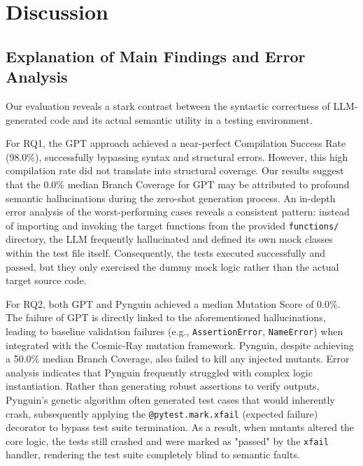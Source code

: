 \section{Discussion}
\label{sec:discussion}

\subsection{Explanation of Main Findings and Error Analysis}
\label{subsec:explanation}

Our evaluation reveals a stark contrast between the syntactic correctness of LLM-generated code and its actual semantic utility in a testing environment. 

For RQ1, the GPT approach achieved a near-perfect Compilation Success Rate (98.0\%), successfully bypassing syntax and structural errors. However, this high compilation rate did not translate into structural coverage. Our results suggest that the 0.0\% median Branch Coverage for GPT may be attributed to profound semantic hallucinations during the zero-shot generation process. An in-depth error analysis of the worst-performing cases reveals a consistent pattern: instead of importing and invoking the target functions from the provided \texttt{functions/} directory, the LLM frequently hallucinated and defined its own mock classes within the test file itself. Consequently, the tests executed successfully and passed, but they only exercised the dummy mock logic rather than the actual target source code.

For RQ2, both GPT and Pynguin achieved a median Mutation Score of 0.0\%. The failure of GPT is directly linked to the aforementioned hallucinations, leading to baseline validation failures (e.g., \texttt{AssertionError}, \texttt{NameError}) when integrated with the Cosmic-Ray mutation framework. Pynguin, despite achieving a 50.0\% median Branch Coverage, also failed to kill any injected mutants. Error analysis indicates that Pynguin frequently struggled with complex logic instantiation. Rather than generating robust assertions to verify outputs, Pynguin's genetic algorithm often generated test cases that would inherently crash, subsequently applying the \texttt{@pytest.mark.xfail} (expected failure) decorator to bypass test suite termination. As a result, when mutants altered the core logic, the tests still crashed and were marked as "passed" by the \texttt{xfail} handler, rendering the test suite completely blind to semantic faults.
